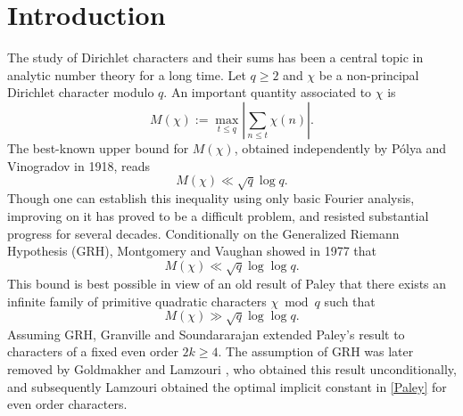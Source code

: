 \documentclass[12pt]{amsart}
\theoremstyle{definition}
\numberwithin{equation}{section}
\begin{document}
\section{Introduction}
The study of Dirichlet characters and their sums has been a central topic in analytic number theory for a long time. Let $q\geq 2$ and  $\chi$ be a non-principal Dirichlet character modulo $q$. An important quantity associated to $\chi$ is 
$$M(\chi) := \max_{t \leq q} \left|\sum_{n \leq t} \chi(n) \right|.$$
The best-known upper bound for $M(\chi)$, obtained independently by P\'olya and Vinogradov in 1918, reads
\begin{equation}\label{PVORIG}
M(\chi)  \ll \sqrt{q} \log q.
\end{equation}
Though one can establish this inequality using only basic Fourier analysis, improving on it has proved to be a difficult problem, and resisted substantial progress for several decades. Conditionally on the Generalized Riemann Hypothesis (GRH),  Montgomery and Vaughan \cite{MV2} showed in 1977 that
\begin{equation}\label{MVCHARBOUND}
M(\chi)\ll \sqrt{q}\log\log q.
\end{equation}
This bound is best possible in view of an old result of Paley \cite{Pa} that there exists an infinite family of primitive quadratic characters $\chi \bmod q$ such that 
\begin{equation}\label{Paley}
M(\chi) \gg \sqrt{q} \log \log q.
\end{equation} 
Assuming GRH, Granville and Soundararajan \cite{GrSo2} extended Paley's result to characters of a fixed even order $2k\geq 4$.  The assumption of GRH was later removed by Goldmakher and Lamzouri \cite{GL2}, who obtained this result unconditionally, and subsequently Lamzouri \cite{LAM} obtained the optimal implicit constant in \eqref{Paley} for even order characters. 
\end{document}
